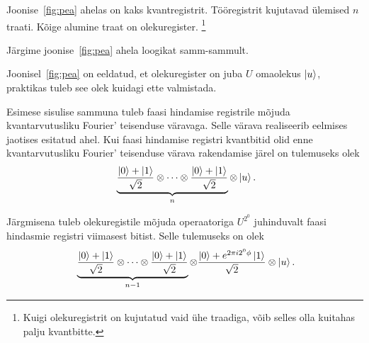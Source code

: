 \documentclass[12pt]{report}
\def\ket#1{\mathinner{|#1\rangle}}
\begin{document}
Joonise~\ref{fig:pea} ahelas on kaks kvantregistrit.
Tööregistrit kujutavad ülemised \(n\) traati.
Kõige alumine traat on olekuregister.%
\footnote{Kuigi olekuregistrit on kujutatud vaid ühe traadiga, võib selles olla kuitahas palju kvantbitte.}

Järgime joonise~\ref{fig:pea} ahela loogikat samm-sammult.

Joonisel~\ref{fig:pea} on eeldatud, et olekuregister on juba \(U\) omaolekus
\(\ket{u}\), praktikas tuleb see olek kuidagi ette valmistada.

Esimese sisulise sammuna tuleb faasi hindamise registrile mõjuda kvantarvutusliku Fourier' teisenduse väravaga.
Selle värava realiseerib eelmises jaotises esitatud ahel.
Kui faasi hindamise registri kvantbitid olid enne kvantarvutusliku Fourier' teisenduse värava rakendamise järel on tulemuseks olek
\begin{align}\label{f:peainit}
    \underbrace{\frac{\ket{0}+\ket{1}}{\sqrt{2}}
    \otimes \cdots
    \otimes \frac{\ket{0}+\ket{1}}{\sqrt{2}}}_n
    \otimes \ket{u} \rlap{.}
\end{align}

Järgmisena tuleb olekuregistile mõjuda operaatoriga \(U^{2^0}\) juhinduvalt faasi hindasmie registri viimasest bitist.
Selle tulemuseks on olek
\begin{align}\label{f:peau0}
    \underbrace{\frac{\ket{0}+\ket{1}}{\sqrt{2}}
    \otimes \cdots
    \otimes \frac{\ket{0}+\ket{1}}{\sqrt{2}}}_{n - 1}
    \otimes \frac{\ket{0}+e^{2\pi i2^0\phi}\ket{1}}{\sqrt{2}}
    \otimes \ket{u} \rlap{.}
\end{align}
\end{document}
